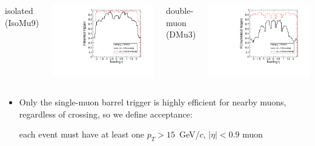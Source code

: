\documentclass[compress]{beamer}
\begin{document}
\begin{frame}
\begin{columns}
\centering isolated (IsoMu9)

\includegraphics[width=\linewidth]{eta_mass5cut_triggerIsoMu9.pdf}

\centering double-muon (DMu3)

\includegraphics[width=\linewidth]{eta_mass5cut_triggerDoubleMu3.pdf}
\end{columns}

\begin{itemize}
\item Only the single-muon barrel trigger is highly efficient for
  nearby muons, regardless of crossing, so we define acceptance:

each event must have at least one $p_T > 15$~GeV/$c$, $|\eta| < 0.9$ muon
\end{itemize}
\end{frame}
\end{document}
